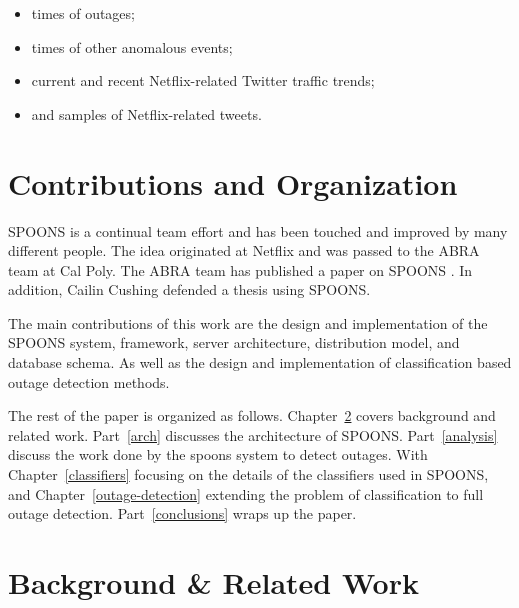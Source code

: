 \documentclass[12pt]{ucthesis}
\begin{document}
\begin{itemize}
   \item times of outages;
   \item times of other anomalous events;
   \item current and recent Netflix-related Twitter traffic trends;
   \item and samples of Netflix-related tweets.
\end{itemize}

\chapter{Contributions and Organization}
\label{contributions-organization}

SPOONS is a continual team effort and has been touched and improved by many different people.
The idea originated at Netflix and was passed to the ABRA team at Cal Poly. The ABRA team has published a paper
on SPOONS \cite{abraPaper}. In addition, Cailin Cushing defended a thesis using SPOONS\cite{cailinThesis}.

The main contributions of this work are the design and implementation of the SPOONS system, framework, server architecture,
distribution model, and database schema. As well as the design and implementation of classification based outage detection
methods.

The rest of the paper is organized as follows.
Chapter~\ref{background-related-work} covers background and related work.
Part~\ref{arch} discusses the architecture of SPOONS.
Part~\ref{analysis} discuss the work done by the spoons system to detect outages.
With Chapter~\ref{classifiers} focusing on the details of the classifiers used in SPOONS, and
Chapter~\ref{outage-detection} extending the problem of classification to full outage detection.
Part~\ref{conclusions} wraps up the paper.

\chapter{Background \& Related Work}
\label{background-related-work}

\end{document}
